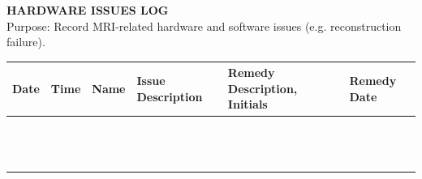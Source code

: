 \documentclass[11pt, letterpaper]{article}
\begin{document}
\begin{center}
    {\Large \textbf{HARDWARE ISSUES LOG}}\\
    \vspace{5pt}
    Purpose: Record MRI-related hardware and software issues (e.g. reconstruction failure).
\end{center}

\vspace{15pt}

\noindent
\begin{tabularx}{\textwidth}{
    | >{\centering\arraybackslash}m{2cm} |
    >{\centering\arraybackslash}m{1.8cm} |
    >{\centering\arraybackslash}m{2cm} |
    >{\centering\arraybackslash}X |
    >{\centering\arraybackslash}m{7cm} |
    >{\centering\arraybackslash}m{2cm} |}
    \hline
    \rowcolor{lightgray}
    \textbf{Date} & \textbf{Time} & \textbf{Name} & \textbf{Issue Description} & \textbf{Remedy Description, Initials} & \textbf{Remedy Date} \\ \hline
    & & & & & \\[3.5ex] \hline
    & & & & & \\[3.5ex] \hline
    & & & & & \\[3.5ex] \hline
    & & & & & \\[3.5ex] \hline
    & & & & & \\[3.5ex] \hline
    & & & & & \\[3.5ex] \hline
    & & & & & \\[3.5ex] \hline
    & & & & & \\[3.5ex] \hline
    & & & & & \\[3.5ex] \hline
    & & & & & \\[3.5ex] \hline
    & & & & & \\[3.5ex] \hline
    & & & & & \\[3.5ex] \hline
    & & & & & \\[3.5ex] \hline
\end{tabularx}
\end{document}
